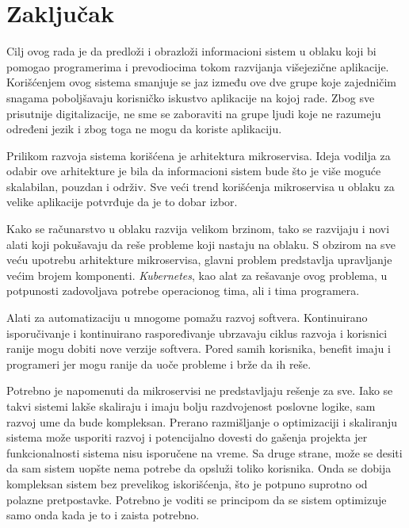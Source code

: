 \chapter{Zaključak}\label{ch:zakljucak}

Cilj ovog rada je da predloži i obrazloži informacioni sistem u oblaku koji bi pomogao 
programerima i prevodiocima tokom razvijanja višejezične aplikacije. Korišćenjem ovog 
sistema smanjuje se jaz između ove dve grupe koje zajedničim snagama poboljšavaju 
korisničko iskustvo aplikacije na kojoj rade. Zbog sve prisutnije digitalizacije, 
ne sme se zaboraviti na grupe ljudi koje ne razumeju određeni jezik i zbog toga 
ne mogu da koriste aplikaciju.

Prilikom razvoja sistema korišćena je arhitektura mikroservisa. Ideja vodilja za odabir 
ove arhitekture je bila da informacioni sistem bude što je više moguće skalabilan, 
pouzdan i održiv. Sve veći trend korišćenja mikroservisa u oblaku za velike aplikacije 
potvrđuje da je to dobar izbor. 

Kako se računarstvo u oblaku razvija velikom brzinom, tako se razvijaju i novi alati 
koji pokušavaju da reše probleme koji nastaju na oblaku. S obzirom na sve veću upotrebu 
arhitekture mikroservisa, glavni problem predstavlja upravljanje većim brojem komponenti.
\textit{Kubernetes}, kao alat za rešavanje ovog problema, u potpunosti zadovoljava 
potrebe operacionog tima, ali i tima programera.

Alati za automatizaciju u mnogome pomažu razvoj softvera. Kontinuirano isporučivanje 
i kontinuirano raspoređivanje ubrzavaju ciklus razvoja i korisnici ranije mogu dobiti 
nove verzije softvera. Pored samih korisnika, benefit imaju i programeri jer mogu 
ranije da uoče probleme i brže da ih reše.

Potrebno je napomenuti da mikroservisi ne predstavljaju rešenje za sve. Iako se takvi 
sistemi lakše skaliraju i imaju bolju razdvojenost poslovne logike, sam razvoj ume da 
bude kompleksan. Prerano razmišljanje o optimizaciji i skaliranju sistema može usporiti 
razvoj i potencijalno dovesti do gašenja projekta jer funkcionalnosti sistema nisu 
isporučene na vreme. Sa druge strane, može se desiti da sam sistem uopšte nema potrebe 
da opsluži toliko korisnika. Onda se dobija kompleksan sistem bez prevelikog iskorišćenja,
što je potpuno suprotno od polazne pretpostavke. Potrebno je voditi se principom da se 
sistem optimizuje samo onda kada je to i zaista potrebno.

